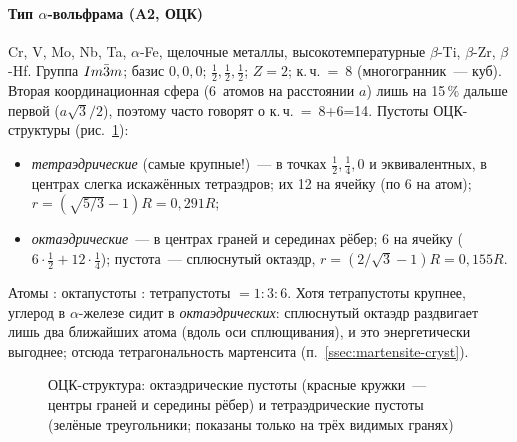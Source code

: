 \paragraph{Тип $\alpha$-вольфрама (A2, ОЦК)}
Cr, V, Mo, Nb, Ta, $\alpha$-Fe, щелочные металлы, высокотемпературные
$\beta$-Ti, $\beta$-Zr, $\beta$-Hf. Группа $Im\bar{3}m$; базис $0,0,0$; $\frac12,\frac12,\frac12$;
$Z=2$; к.\,ч.~=~8 (многогранник~— куб). Вторая координационная сфера
(6~атомов на расстоянии $a$) лишь на 15\,\% дальше первой ($a\sqrt3/2$), поэтому
часто говорят о к.\,ч.~=~8+6=14. Пустоты ОЦК-структуры
(рис.~\ref{fig:bcc-voids}):
\begin{itemize}
\item \emph{тетраэдрические} (самые крупные!)~— в точках $\frac12,\frac14,0$ и
эквивалентных, в центрах слегка искажённых тетраэдров; их 12 на ячейку
(по 6 на атом); $r=(\sqrt{5/3}-1)R=0{,}291R$;
\item \emph{октаэдрические}~— в центрах граней и серединах рёбер; 6 на
ячейку ($6\cdot\frac12+12\cdot\frac14$); пустота~— сплюснутый октаэдр,
$r=(2/\sqrt3-1)R=0{,}155R$.
\end{itemize}
Атомы : октапустоты : тетрапустоты $=1:3:6$. Хотя тетрапустоты крупнее,
углерод в $\alpha$-железе сидит в \emph{октаэдрических}: сплюснутый октаэдр
раздвигает лишь два ближайших атома (вдоль оси сплющивания), и это
энергетически выгоднее; отсюда тетрагональность мартенсита
(п.~\ref{ssec:martensite-cryst}).

\begin{figure}[ht]
\centering
{}
\caption{ОЦК-структура: октаэдрические пустоты (красные кружки~— центры
граней и середины рёбер) и тетраэдрические пустоты (зелёные треугольники;
показаны только на трёх видимых гранях)}
\label{fig:bcc-voids}
\end{figure}


